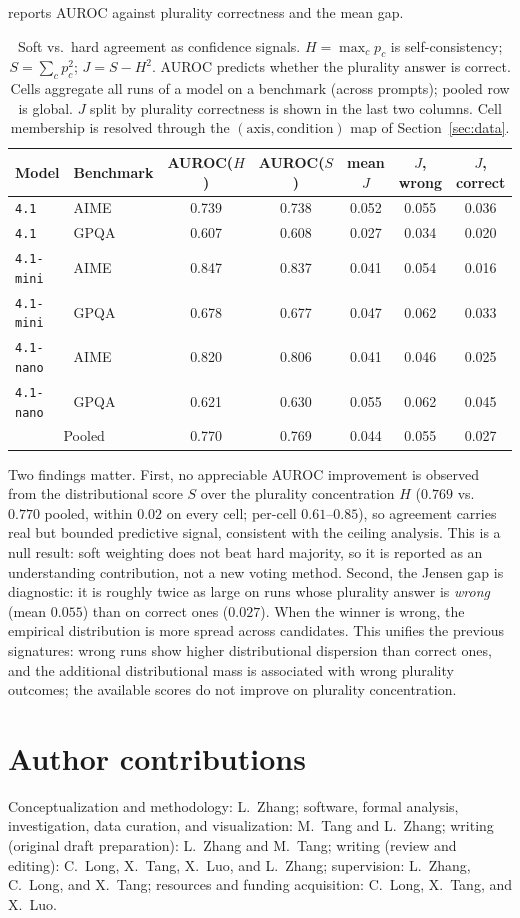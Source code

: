 \documentclass{article}
\begin{document}
 reports AUROC against plurality correctness and the
mean gap. 
\begin{table}[H]
\centering
\caption{Soft vs.\ hard agreement as confidence signals. $H=\max_c p_c$
is self-consistency; $S=\sum_c p_c^2$; $J=S-H^2$. AUROC predicts whether
the plurality answer is correct. Cells aggregate all runs of a model on a
benchmark (across prompts); pooled row is global. $J$ split by plurality
correctness is shown in the last two columns. Cell membership is resolved
through the $(\text{axis},\text{condition})$ map of Section~\ref{sec:data}.}
\label{tab:jensen}
\begin{tabular}{llccccc}
\toprule
Model & Benchmark & AUROC($H$) & AUROC($S$) & mean $J$ & $J$, wrong & $J$, correct \\
\midrule
\texttt{4.1} & AIME & 0.739 & 0.738 & 0.052 & 0.055 & 0.036 \\
\texttt{4.1} & GPQA & 0.607 & 0.608 & 0.027 & 0.034 & 0.020 \\
\texttt{4.1-mini} & AIME & 0.847 & 0.837 & 0.041 & 0.054 & 0.016 \\
\texttt{4.1-mini} & GPQA & 0.678 & 0.677 & 0.047 & 0.062 & 0.033 \\
\texttt{4.1-nano} & AIME & 0.820 & 0.806 & 0.041 & 0.046 & 0.025 \\
\texttt{4.1-nano} & GPQA & 0.621 & 0.630 & 0.055 & 0.062 & 0.045 \\
\midrule
\multicolumn{2}{c}{Pooled} & 0.770 & 0.769 & 0.044 & 0.055 & 0.027 \\
\bottomrule
\end{tabular}
\end{table}
Two findings matter. First, no appreciable AUROC improvement is observed from the distributional score $S$ over the plurality concentration $H$
($0.769$ vs.\ $0.770$
pooled, within $0.02$ on every cell; per-cell $0.61$--$0.85$), so
agreement carries real but bounded predictive signal, consistent with
the ceiling analysis. This is a
null
result: soft weighting does not beat hard majority, so it is reported as
an understanding contribution, not
a new voting method.
Second, the Jensen gap is diagnostic: it is roughly twice as large on
runs whose plurality answer is \emph{wrong} (mean $0.055$) than on
correct ones ($0.027$). When the winner is wrong, the empirical
distribution is more spread across candidates. This unifies the previous
signatures: wrong runs show higher distributional dispersion than
correct ones, and the additional distributional mass is associated
with wrong plurality outcomes; the available scores do not improve on
plurality concentration.

\section*{Author contributions}
\label{app:contrib}

Conceptualization and methodology: L.\ Zhang; software, formal analysis,
investigation, data curation, and visualization: M.\ Tang and L.\ Zhang;
writing (original draft preparation): L.\ Zhang and M.\ Tang; writing
(review and editing): C.\ Long, X.\ Tang, X.\ Luo, and L.\ Zhang;
supervision: L.\ Zhang, C.\ Long, and X.\ Tang; resources and funding
acquisition: C.\ Long, X.\ Tang, and X.\ Luo.
\end{document}

